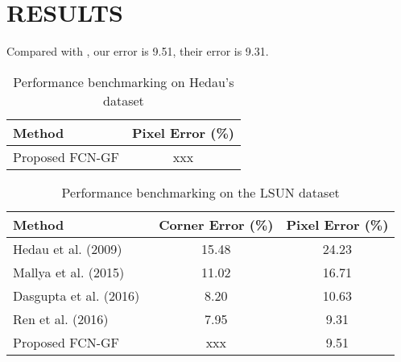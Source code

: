 \section{RESULTS}
\label{sec:Res}



Compared with \cite{ren2016three}, our error is 9.51, their error is 9.31. 


\begin{table}
	\centering 
	\caption{Performance benchmarking on Hedau's dataset}
	\label{table:comparison-hedau}
	\begin{tabular}{l|c}
		\hline 
	Method & Pixel Error (\%) \\
	\hline
	Proposed FCN-GF & xxx \\
		\hline
	\end{tabular}
\end{table}



\begin{table}
	\centering 
	\caption{Performance benchmarking on the LSUN dataset}
	\label{table:comparison-lsun}
	\begin{tabular}{l|c|c}
		\hline 
		Method & Corner Error (\%) & Pixel Error (\%) \\
		\hline
		Hedau et al. (2009)~\cite{hedau2009recovering} & 15.48 & 24.23 \\
		Mallya et al. (2015)~\cite{mallya2015learning} & 11.02 & 16.71 \\
		Dasgupta et al. (2016)~\cite{dasgupta2016delay} & 8.20 & 10.63 \\
		Ren et al. (2016)~\cite{ren2016three} & 7.95 & 9.31 \\
		Proposed FCN-GF & xxx & 9.51 \\
		\hline
	\end{tabular}
\end{table}